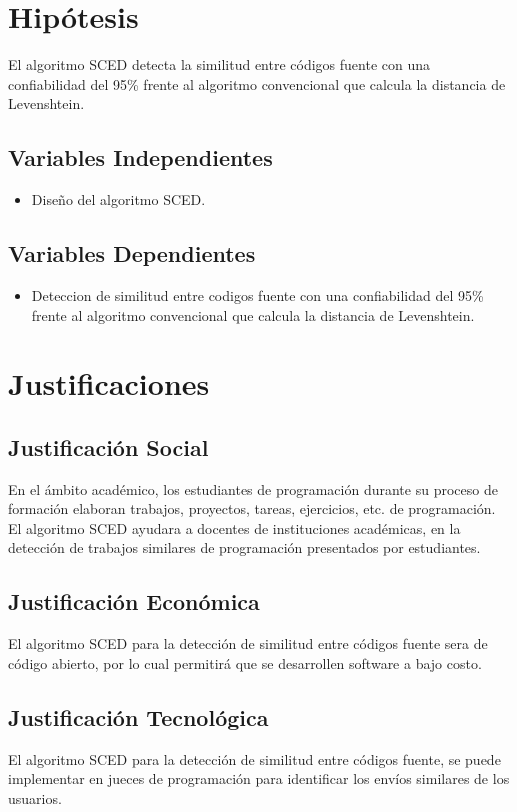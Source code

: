 \section{Hipótesis}
El algoritmo SCED detecta la similitud entre códigos fuente con una confiabilidad del 95\% frente al algoritmo convencional que calcula la distancia de Levenshtein.
\subsection{Variables Independientes}
\begin{itemize}
    \item Diseño del algoritmo SCED.
\end{itemize}
\subsection{Variables Dependientes}
\begin{itemize}
    \item Deteccion de similitud entre codigos fuente con una confiabilidad del 95\% frente al algoritmo convencional que calcula la distancia de Levenshtein.
\end{itemize}
\section{Justificaciones}
\subsection{Justificación Social}
En el ámbito académico, los estudiantes de programación durante su proceso de formación elaboran trabajos, proyectos, tareas, ejercicios, etc. de programación. El algoritmo SCED ayudara a docentes de instituciones académicas, en la detección de trabajos similares de programación presentados por estudiantes.
\subsection{Justificación Económica}
El algoritmo SCED para la detección de similitud entre códigos fuente sera de código abierto, por lo cual permitirá que se desarrollen software a bajo costo.
\subsection{Justificación Tecnológica}
El algoritmo SCED para la detección de similitud entre códigos fuente, se puede implementar en jueces de programación para identificar los envíos similares de los usuarios.
